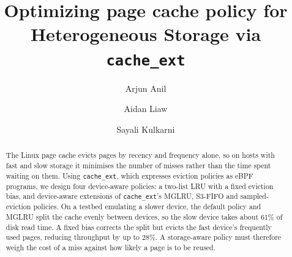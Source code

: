 \documentclass[11pt,sigconf,nonacm]{acmart}
\newcommand{\cacheExt}{\texttt{cache\_ext}}
\begin{document}
\title{Optimizing page cache policy for Heterogeneous Storage via \texttt{cache\_ext}}


\author{Arjun Anil}

\author{Aidan Liaw}

\author{Sayali Kulkarni}

\renewcommand{\shortauthors}{Anil et al.}

\begin{abstract}
The Linux page cache evicts pages by recency and frequency alone, so on hosts with fast and slow storage it minimises the number of misses rather than the time spent waiting on them. Using \cacheExt{}, which expresses eviction policies as eBPF programs, we design four device-aware policies: a two-list LRU with a fixed eviction bias, and device-aware extensions of \cacheExt{}'s MGLRU, S3-FIFO and sampled-eviction policies. On a testbed emulating a slower device, the default policy and MGLRU split the cache evenly between devices, so the slow device takes about 61\% of disk read time. A fixed bias corrects the split but evicts the fast device's frequently used pages, reducing throughput by up to 28\%. A storage-aware policy must therefore weigh the cost of a miss against how likely a page is to be reused. 
\end{abstract}
\end{document}
